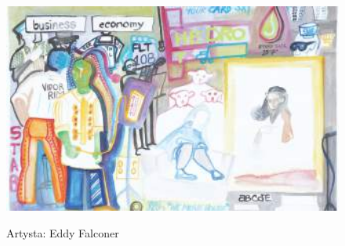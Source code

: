 \newpage
\begin{figure}[h]
\centering
\includegraphics[width=14cm]{TeX_files/2-3.png}
\label{2-2}
\begin{flushright}
Artysta: Eddy Falconer
\end{flushright}
\end{figure}

